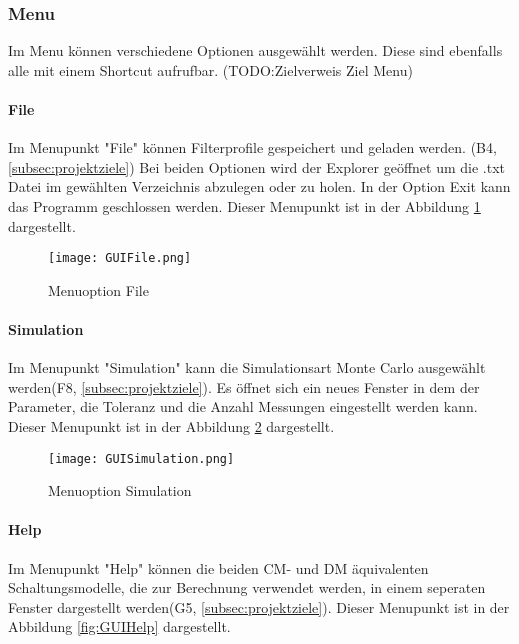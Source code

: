 \subsubsection{Menu} \label{subsubsec:menu}

Im Menu können verschiedene Optionen ausgewählt werden. Diese sind ebenfalls alle mit einem Shortcut aufrufbar. (TODO:Zielverweis Ziel Menu)

\bigskip
{}
\paragraph{File} \label{para:file}
Im Menupunkt "File" können Filterprofile gespeichert und geladen werden. (B4,  \ref{subsec:projektziele}) Bei beiden Optionen wird der Explorer geöffnet um die .txt Datei im gewählten Verzeichnis abzulegen oder zu holen. In der Option Exit kann das Programm geschlossen werden. Dieser Menupunkt ist in der Abbildung \ref{fig:GUIFile}  dargestellt.

\begin{figure}[H]
	\centering
	\texttt{[image: GUIFile.png]}
	\caption{Menuoption File}
	\label{fig:GUIFile}
\end{figure}

\bigskip

\paragraph{Simulation} \label{para:simulation}
Im Menupunkt "Simulation" kann die Simulationsart Monte Carlo ausgewählt werden(F8,  \ref{subsec:projektziele}). Es öffnet sich ein neues Fenster in dem der Parameter, die Toleranz und die Anzahl Messungen eingestellt werden kann. Dieser Menupunkt ist in der Abbildung \ref{fig:GUISimulation} dargestellt.

\begin{figure}[H]
	\centering
	\texttt{[image: GUISimulation.png]}
	\caption{Menuoption Simulation}
	\label{fig:GUISimulation}
\end{figure}


\paragraph{Help} \label{para:Help}
Im Menupunkt "Help" können die beiden CM- und DM äquivalenten Schaltungsmodelle, die zur Berechnung verwendet werden, in einem seperaten Fenster dargestellt werden(G5,  \ref{subsec:projektziele}). Dieser Menupunkt ist in der Abbildung \ref{fig:GUIHelp}  dargestellt.

